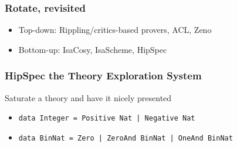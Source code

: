 \documentclass[serif,professionalfont]{beamer}
\newcommand\dn[0]{\vspace{\baselineskip}}
\newcommand\hs[1]{\texttt{#1}}
\begin{document}
\begin{frame}
  \frametitle{Rotate, revisited}

    \rotateprop \rotatestep \stuck

    \pause

    \begin{itemize}
        \item Top-down: Rippling/critics-based provers, ACL, Zeno
            \pause
        \item Bottom-up: IsaCosy, IsaScheme, HipSpec
    \end{itemize}

\end{frame}



\begin{frame}
  \frametitle{HipSpec the Theory Exploration System}


  \begin{center}
      Saturate a theory and have it nicely presented
  \end{center}

  \dn
  \pause


  \begin{itemize}
      \item \hs{data Integer = Positive Nat | Negative Nat}
      \item \hs{data BinNat  = Zero | ZeroAnd BinNat | OneAnd BinNat}
  \end{itemize}


\end{frame}
\end{document}

